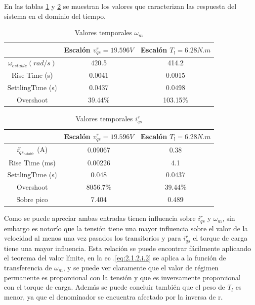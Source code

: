 \documentclass[10pt]{article}
\begin{document}
\begin{itemize}
	En las tablas \ref{tab:1} y \ref{tab:2} se muestran los valores que caracterizan las respuesta del sistema en el dominio del tiempo.
	\begin{table}[!h]
	\begin{center}
	\begin{tabular}{| c | c | c | }
	\hline
	  & Escalón $v^{r}_{qs}=19.596 V$& Escalón $T_{l}=6.28 N.m$\\ \hline
	 $\omega_{estable} (rad/s)$ &  420.5 &  414.2 \\ \hline
	 Rise Time (s) &  0.0041 &  0.0015\\ \hline
	SettlingTime (s)& 0.0437 & 0.0498 \\ \hline
	Overshoot & 39.44$\%$ & 103.15$\%$ \\ \hline
	\end{tabular}
	\caption{Valores temporales $\omega_{m}$}
	\label{tab:1}
	\end{center}
	\end{table}
	
	\begin{table}[!h]
	\begin{center}
	\begin{tabular}{| c | c | c | }
	\hline
	  & Escalón $v^{r}_{qs}=19.596 V$& Escalón $T_{l}=6.28 N.m$\\ \hline
	 $ i^{r}_{qs_{estable}}$  (A) &   0.09067 &  0.38 \\ \hline
	 Rise Time (ms) &  0.00226 &  4.1\\ \hline
	SettlingTime (s)& 0.048 & 0.0437 \\ \hline
	Overshoot & 8056.7$\%$ & 39.44$\%$ \\ \hline
	Sobre pico & 7.404 & 0.489 \\ \hline
	\end{tabular}
	\caption{Valores temporales $i^{r}_{qs}$}
	\label{tab:2}
	\end{center}
	\end{table}
	
	Como se puede apreciar ambas entradas tienen influencia sobre $ i^{r}_{qs}$ y $\omega_{m}$, sin embargo es notorío que la tensión tiene una mayor influencia sobre el valor de la velocidad al menos una vez pasados los transitorios y para $ i^{r}_{qs}$ el torque de carga tiene una mayor influencia. Esta relación se puede encontrar fácilmente aplicando el teorema del valor límite, en la ec .\ref{eq:2.1.2.i.2} se aplica a la función de transferencia de $\omega_{m}$, y se puede ver claramente que el valor de régimen permanente es proporcional con la tensión y que es inversamente proporcional con el torque de carga. Además se puede concluir también que el peso de $T_{l}$ es menor, ya que el denominador se encuentra afectado por la inversa de r.
	

\end{itemize}
\end{document}

